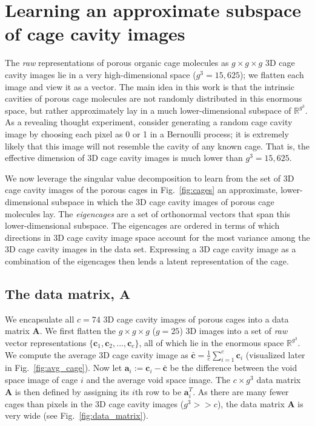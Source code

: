 \documentclass[journal=jacsat,manuscript=article,layout=traditional]{achemso}
\begin{document}
\section{Learning an approximate subspace of cage cavity images} 

The \emph{raw} representations of porous organic cage molecules as $g\times g \times g$ 3D cage cavity images lie in a very high-dimensional space ($g^3=15,625$); we flatten each image and view it as a vector. The main idea in this work is that the intrinsic cavities of porous cage molecules are not randomly distributed in this enormous space, but rather approximately lay in a much lower-dimensional subspace of $\mathbb{R}^{g^3}$. As a revealing thought experiment, consider generating a random cage cavity image by choosing each pixel as 0 or 1 in a Bernoulli process; it is extremely likely that this image will not resemble the cavity of any known cage. That is, the effective dimension of 3D cage cavity images is much lower than $g^3=15,625$. 

We now leverage the singular value decomposition \cite{muller2004singular,kalman1996singularly,strang1993introduction} to learn from the set of 3D cage cavity images of the porous cages in Fig.~\ref{fig:cages} an approximate, lower-dimensional subspace in which the 3D cage cavity images of porous cage molecules lay.
The \emph{eigencages} are a set of orthonormal vectors that span this lower-dimensional subspace. The eigencages are ordered in terms of which directions in 3D cage cavity image space account for the most variance among the 3D cage cavity images in the data set. Expressing a 3D cage cavity image as a combination of the eigencages then lends a latent representation of the cage.

\subsection{The data matrix, $\mathbf{A}$} We encapsulate all $c=74$ 3D cage cavity images of porous cages into a data matrix $\mathbf{A}$. We first flatten the $g\times g\times g$ ($g=25$) 3D images into a set of \emph{raw} vector representations $\{\mathbf{c}_1, \mathbf{c}_2, ..., \mathbf{c}_c\}$, all of which lie in the enormous space $\mathbb{R}^{g^3}$. 
We compute the average 3D cage cavity image as $\bar{\mathbf{c}}=\frac{1}{c}\sum_{i=1}^c  \mathbf{c}_i$ (visualized later in Fig.~\ref{fig:avg_cage}). Now let $\mathbf{a}_i:=\mathbf{c}_i-\bar{\mathbf{c}}$ be the difference between the void space image of cage $i$ and the average void space image. The $c \times g^3$ data matrix $\mathbf{A}$ is then defined by assigning its $i$th row to be $\mathbf{a}_i^T$. As there are many fewer cages than pixels in the 3D cage cavity images ($g^3>>c$), the data matrix $\mathbf{A}$ is very wide (see Fig.~\ref{fig:data_matrix}).
\end{document}
